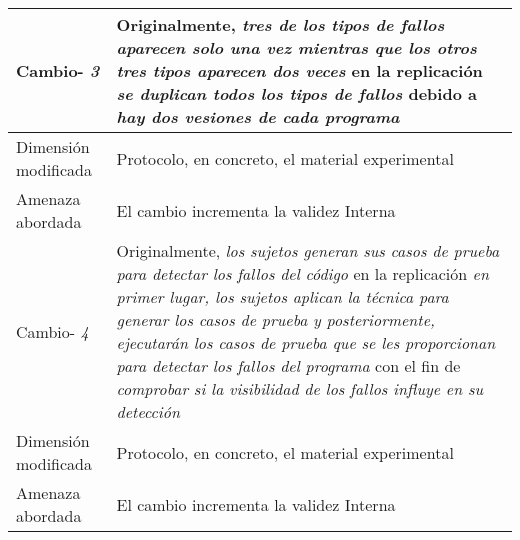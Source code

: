 \begin{table}
\begin{tabular}{| p{3.3cm} | p{9cm} |}
 Cambio- \textit{3}   & \parbox[t]{9cm} {Originalmente,  \textit{ tres de los tipos de fallos aparecen solo una vez mientras que los otros tres tipos aparecen dos veces } } \parbox[t]{9cm}{en la replicación \textit{ se duplican todos los tipos de fallos } }  debido a \textit{hay dos vesiones de cada programa } \\  \hline
Dimensión modificada & Protocolo, en concreto, el material experimental
 \\  \hline 
Amenaza abordada  & El cambio incrementa la validez Interna \\  \hline \hline

Cambio- \textit{4}   & \parbox[t]{9cm} {Originalmente,  \textit{ los sujetos generan sus casos de prueba para detectar los fallos del código} } \parbox[t]{9cm}{en la replicación \textit{en primer lugar, los sujetos aplican la técnica para generar los casos de prueba y posteriormente, ejecutarán los casos de prueba que se les proporcionan para detectar los fallos del programa} }  con el fin de  \textit{comprobar si la visibilidad de los fallos influye en su detección} \\  \hline
Dimensión modificada & Protocolo, en concreto, el material experimental
 \\  \hline 
Amenaza abordada  & El cambio incrementa la validez Interna \\  \hline \hline

\end{tabular}
\label{tab:plantillaUPM2}
\end{table}





